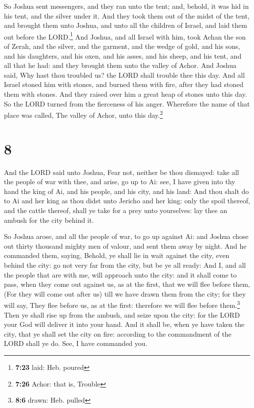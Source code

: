  So Joshua sent messengers, and they ran unto the tent;
and, behold, it was hid in his tent, and the silver under it.
 And they took them out of the midst of the tent, and
brought them unto Joshua, and unto all the children of Israel, and laid
them out before the LORD.\footnote{\textbf{7:23} laid: Heb. poured}
 And Joshua, and all Israel with him, took Achan the son
of Zerah, and the silver, and the garment, and the wedge of gold, and
his sons, and his daughters, and his oxen, and his asses, and his sheep,
and his tent, and all that he had: and they brought them unto the valley
of Achor.  And Joshua said, Why hast thou troubled us?
the LORD shall trouble thee this day. And all Israel stoned him with
stones, and burned them with fire, after they had stoned them with
stones.  And they raised over him a great heap of stones
unto this day. So the LORD turned from the fierceness of his anger.
Wherefore the name of that place was called, The valley of Achor, unto
this day.\footnote{\textbf{7:26} Achor: that is, Trouble}

\hypertarget{section-7}{%
\section{8}\label{section-7}}

 And the LORD said unto Joshua, Fear not, neither be thou
dismayed: take all the people of war with thee, and arise, go up to Ai:
see, I have given into thy hand the king of Ai, and his people, and his
city, and his land:  And thou shalt do to Ai and her king
as thou didst unto Jericho and her king: only the spoil thereof, and the
cattle thereof, shall ye take for a prey unto yourselves: lay thee an
ambush for the city behind it.

 So Joshua arose, and all the people of war, to go up
against Ai: and Joshua chose out thirty thousand mighty men of valour,
and sent them away by night.  And he commanded them,
saying, Behold, ye shall lie in wait against the city, even behind the
city: go not very far from the city, but be ye all ready: 
And I, and all the people that are with me, will approach unto the city:
and it shall come to pass, when they come out against us, as at the
first, that we will flee before them,  (For they will come
out after us) till we have drawn them from the city; for they will say,
They flee before us, as at the first: therefore we will flee before
them.\footnote{\textbf{8:6} drawn: Heb. pulled}  Then ye
shall rise up from the ambush, and seize upon the city: for the LORD
your God will deliver it into your hand.  And it shall be,
when ye have taken the city, that ye shall set the city on fire:
according to the commandment of the LORD shall ye do. See, I have
commanded you.

